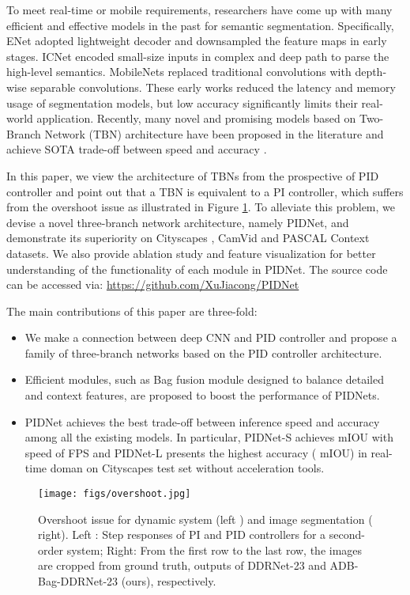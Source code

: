 \documentclass[10pt,twocolumn,letterpaper]{article}
\begin{document}
To meet real-time or mobile requirements, researchers have come up with many efficient and effective models in the past for semantic segmentation. Specifically, ENet \cite{enet} adopted lightweight decoder and downsampled the feature maps in early stages. ICNet \cite{icnet} encoded small-size inputs in complex and deep path to parse the high-level semantics. MobileNets \cite{mobilenets, mobilenetv2} replaced traditional convolutions with depth-wise separable convolutions. These early works reduced the latency and memory usage of segmentation models, but low accuracy significantly limits their real-world application. Recently, many novel and promising models based on Two-Branch Network (TBN) architecture have been proposed in the literature and achieve SOTA trade-off between speed and accuracy \cite{bisenet,fast_scnn, contextnet, stdc, ddrnet}. 

In this paper, we view the architecture of TBNs from the prospective of PID controller and point out that a TBN is equivalent to a PI controller, which suffers from the overshoot issue as illustrated in Figure \ref{fig:overshoot}. 
To alleviate this problem, we devise a novel three-branch network architecture, namely PIDNet, and demonstrate its superiority on Cityscapes \cite{cityscapes}, CamVid \cite{camvid} and PASCAL Context \cite{pascal_context} datasets. We also provide ablation study and feature visualization for better understanding of the functionality of each module in PIDNet. The source code can be accessed via: \url{https://github.com/XuJiacong/PIDNet}

The main contributions of this paper are three-fold:
\begin{itemize}
  \item We make a connection between deep CNN and PID controller and propose a family of three-branch networks based on the PID controller architecture. 
  \item Efficient modules, such as Bag fusion module designed to balance detailed and context features, are proposed to boost the performance of PIDNets. 
  \item PIDNet achieves the best trade-off between inference speed and accuracy among all the existing models. In particular, PIDNet-S achieves  mIOU with speed of  FPS and PIDNet-L presents the highest accuracy ( mIOU) in real-time doman on Cityscapes test set without acceleration tools.
\end{itemize}

\begin{figure}
\centering
    \texttt{[image: figs/overshoot.jpg]}
\caption{Overshoot issue for dynamic system (left ) and image segmentation ( right). Left : Step responses of PI and PID controllers for a second-order system;  Right: From the first row to the last row, the images are cropped from ground truth, outputs of DDRNet-23 \cite{ddrnet} and ADB-Bag-DDRNet-23 (ours), respectively.}
\label{fig:overshoot}
\end{figure}
\end{document}
